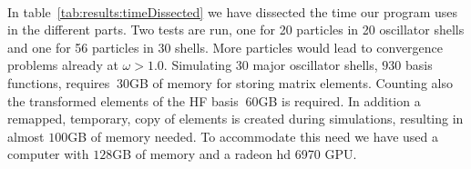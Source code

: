 \paragraph{}
In table~\ref{tab:results:timeDissected} we have dissected the time our program uses in the different parts. 
Two tests are run, one for 20 particles in 20 oscillator shells and one for 56 particles in 30 shells.
More particles would lead to convergence problems already at $\omega > 1.0$.
Simulating 30 major oscillator shells, $930$ basis functions, requires $~30$GB of memory for storing matrix elements.
Counting also the transformed elements of the HF basis $~60$GB is required.
In addition a remapped, temporary, copy of elements is created during simulations, resulting in almost $100$GB of memory needed.
To accommodate this need we have used a computer with $128$GB of memory and a radeon hd 6970 GPU.


